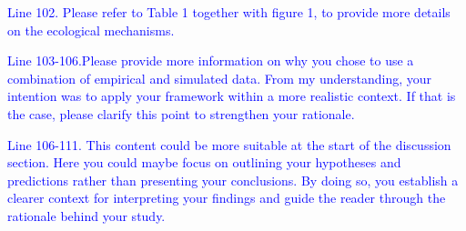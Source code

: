 \documentclass[
]{article}
\begin{document}
\textcolor{blue}{Line 102. Please refer to Table 1 together with figure 1, to provide more details on the ecological mechanisms.}

\textcolor{blue}{Line 103-106.Please provide more information on why you chose to use a combination of empirical and simulated data.
From my understanding, your intention was to apply your framework within a more realistic context.
If that is the case, please clarify this point to strengthen your rationale.}

\textcolor{blue}{Line 106-111.
This content could be more suitable at the start of the discussion section.
Here you could maybe focus on outlining your hypotheses and predictions rather than presenting your conclusions.
By doing so, you establish a clearer context for interpreting your findings and guide the reader through the rationale behind your study.}

\end{document}
